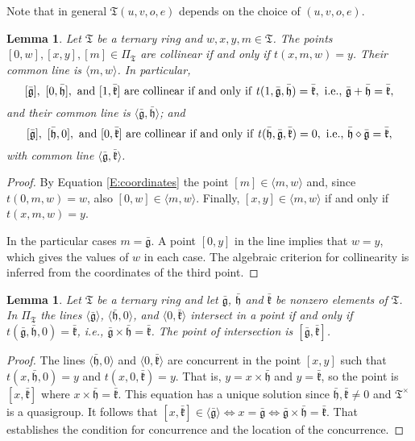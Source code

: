 \documentclass[reqno,12pt]{amsart}
\newtheorem{lem}[thm]{Lemma}
\theoremstyle{remark}
\numberwithin{equation}{section}
\numberwithin{figure}{section}
\newcommand \fT{\mathfrak T}
\newcommand\Tg{\bar{\mathfrak g}}
\newcommand\Th{\bar{\mathfrak h}}
\newcommand\Tk{\bar{\mathfrak k}}
\newcommand\PP{\Pi}	%
\begin{document}
Note that in general $\fT(u,v,o,e)$ depends on the choice of $(u,v,o,e)$.

\begin{lem} \label{collinearpointsinaplane}
Let $\fT$ be a ternary ring and $w,x,y,m \in \fT$.  The points $[0, w], [x, y], [m] \in \PP_\fT$ are collinear if and only if $t(x, m, w) = y$.  Their common line is $\langle m, w \rangle$.  In particular, 
$$
[ \Tg],\ [ 0, \Th], \text{ and\/ } [ 1, \Tk ] \text{ are collinear if and only if\/ } t(1,\Tg,\Th )= \Tk, \text{ i.e., } \Tg+\Th=\Tk,
$$
and their common line is $\langle \Tg,\Th\rangle$; and 
$$
[ \Tg],\ [\Th,0 ], \text{ and\/ } [ 0, \Tk] \text{ are collinear if and only if\/ } t(\Th,\Tg,\Tk )= 0, \text{ i.e., } \Th\diamond\Tg=\Tk,
$$
with common line $\langle \Tg, \Tk \rangle$.
\end{lem}

\begin{proof} 
By Equation \eqref{E:coordinates} the point $[m] \in \langle m, w \rangle$ and, since $t(0,m,w)=w$, also $[0, w] \in \langle m, w \rangle.$  Finally, $[x, y] \in \langle m, w \rangle$ if and only if $t(x,m,w)= y$.

In the particular cases $m = \Tg$.  A point $[0,y]$ in the line implies that $w=y$, which gives the values of $w$ in each case.  The algebraic criterion for collinearity is inferred from the coordinates of the third point.
\end{proof}

\begin{lem}\label{intersectionofthreelines} 
Let $\fT$ be a ternary ring and let $\Tg$, $\Th$ and  $\Tk$ be nonzero elements of $\fT$.  
In $\PP_\fT$ the lines $\langle \Tg \rangle$, $\langle \Th, 0 \rangle$, and $\langle 0, \Tk \rangle$ intersect in a point if and only if $t(\Tg,\Th,0)=\Tk$, i.e., $\Tg \times \Th = \Tk$.  The point of intersection is $[\Tg, \Tk]$.
\end{lem}

\begin{proof} 
The lines $\langle \Th,0 \rangle$ and $\langle 0, \Tk \rangle$ are concurrent in the point $[x,y]$ such that $t(x,\Th,0)=y$ and $t(x,0,\Tk)=y$.  That is, $y=x\times\Th$ and $y=\Tk$, so the point is $[x,\Tk]$ where $x\times\Th=\Tk$.  This equation has a unique solution since $\Th,\Tk\neq0$ and $\fT^\times$ is a quasigroup.  It follows that $[x,\Tk]\in\langle\Tg\rangle \iff x=\Tg \iff \Tg\times\Th=\Tk$.  That establishes the condition for concurrence and the location of the concurrence. 
\end{proof}
\end{document}

